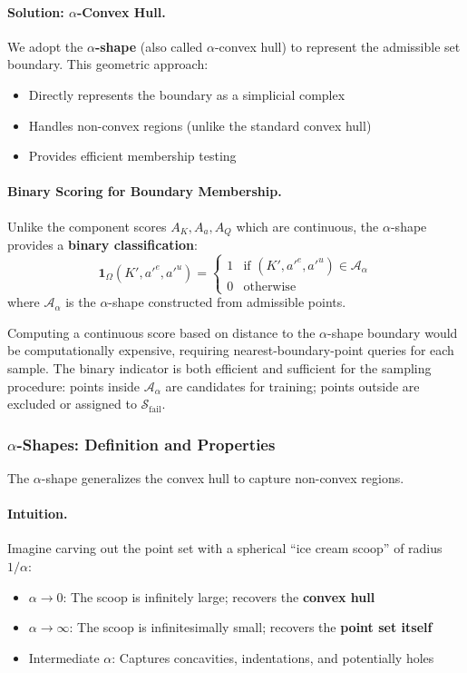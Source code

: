 \paragraph{Solution: $\alpha$-Convex Hull.}
We adopt the \textbf{$\alpha$-shape} (also called $\alpha$-convex hull) to represent the admissible set boundary. This geometric approach:
\begin{itemize}
    \item Directly represents the boundary as a simplicial complex
    \item Handles non-convex regions (unlike the standard convex hull)
    \item Provides efficient membership testing
\end{itemize}

\paragraph{Binary Scoring for Boundary Membership.}
Unlike the component scores $A_K, A_a, A_Q$ which are continuous, the $\alpha$-shape provides a \textbf{binary classification}:
\begin{equation}
    \mathbf{1}_{\Omega}(K', a'^e, a'^u) = \begin{cases}
        1 & \text{if } (K', a'^e, a'^u) \in \mathcal{A}_\alpha \\
        0 & \text{otherwise}
    \end{cases}
\end{equation}
where $\mathcal{A}_\alpha$ is the $\alpha$-shape constructed from admissible points.

Computing a continuous score based on distance to the $\alpha$-shape boundary would be computationally expensive, requiring nearest-boundary-point queries for each sample. The binary indicator is both efficient and sufficient for the sampling procedure: points inside $\mathcal{A}_\alpha$ are candidates for training; points outside are excluded or assigned to $\mathcal{S}_{\text{fail}}$.


\subsubsection{$\alpha$-Shapes: Definition and Properties}

The $\alpha$-shape generalizes the convex hull to capture non-convex regions.

\paragraph{Intuition.}
Imagine carving out the point set with a spherical ``ice cream scoop'' of radius $1/\alpha$:
\begin{itemize}
    \item $\alpha \to 0$: The scoop is infinitely large; recovers the \textbf{convex hull}
    \item $\alpha \to \infty$: The scoop is infinitesimally small; recovers the \textbf{point set itself}
    \item Intermediate $\alpha$: Captures concavities, indentations, and potentially holes
\end{itemize}

